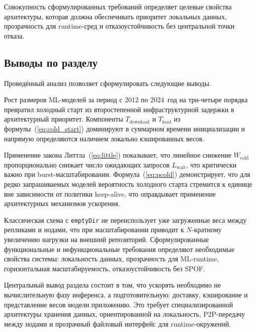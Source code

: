 Совокупность сформулированных требований определяет целевые свойства архитектуры, которая должна обеспечивать приоритет локальных данных, прозрачность для runtime-сред и отказоустойчивость без центральной точки отказа.

\subsection{Выводы по разделу}

Проведённый анализ позволяет сформулировать следующие выводы.

Рост размеров ML-моделей за период с 2012 по 2024~год на три-четыре порядка превратил холодный старт из второстепенной инфраструктурной задержки в архитектурный приоритет. Компоненты $T_{\mathrm{download}}$ и $T_{\mathrm{load}}$ из формулы~(\ref{eq:cold_start}) доминируют в суммарном времени инициализации и напрямую определяются наличием локально кэшированных весов.

Применение закона Литтла~(\ref{eq:little}) показывает, что линейное снижение $W_{\mathrm{cold}}$ пропорционально снижает число ожидающих запросов $L_{\mathrm{wait}}$, что критически важно при burst-масштабировании. Формула~(\ref{eq:pcold}) демонстрирует, что для редко запрашиваемых моделей вероятность холодного старта стремится к единице вне зависимости от политики keep-alive, что оправдывает применение архитектурных механизмов ускорения.

Классическая схема с \texttt{emptyDir} не переиспользует уже загруженные веса между репликами и нодами, что при масштабировании приводит к $N$-кратному увеличению нагрузки на внешний репозиторий. Сформулированные функциональные и нефункциональные требования определяют необходимые свойства системы: локальность данных, прозрачность для ML-runtime, горизонтальная масштабируемость, отказоустойчивость без SPOF.

Центральный вывод раздела состоит в том, что ускорять необходимо не вычислительную фазу инференса, а подготовительную: доставку, кэширование и представление весов модели приложению. Это требует специализированной архитектуры хранения данных, ориентированной на локальность, P2P-передачу между нодами и прозрачный файловый интерфейс для runtime-окружений.
